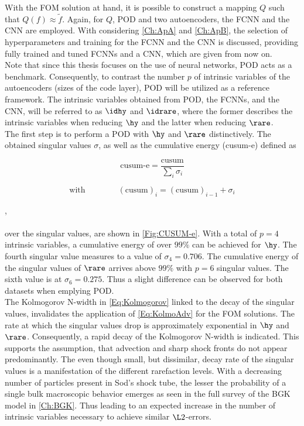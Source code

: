 With the FOM solution at hand, it is possible to construct a mapping \(Q\) such that \(Q(f)\approx \tilde{f}\). Again, for \(Q\), POD and two autoencoders, the FCNN and the CNN are employed. With considering \cref{Ch:ApA} and \cref{Ch:ApB}, the selection of hyperparameters and training for the FCNN and the CNN is discussed, providing fully trained and tuned FCNNs and a CNN, which are given from now on.\\
Note that since this thesis focuses on the use of neural networks, POD acts as a benchmark. Consequently, to contrast the number \(p\) of intrinsic variables of the autoencoders (sizes of the code layer), POD will be utilized as a reference framework. The intrinsic variables obtained from POD, the FCNNs, and the CNN, will be referred to as \(\idhy\) and \(\idrare\), where the former describes the intrinsic variables when reducing \(\hy\) and the latter when reducing \(\rare\).\\
The first step is to perform a POD with \(\hy\) and \(\rare\) distinctively. The obtained singular values \(\sigma\), as well as the cumulative energy (cusum-e) defined as\\
\noindent \begin{minipage}{.3\linewidth}
	\begin{equation}
	\textrm{cusum-e} = \frac{\textrm{cusum}}{\sum_i \sigma_i}
	\end{equation}
\end{minipage}%
\begin{minipage}{.7\linewidth}
	\begin{equation}
			\textrm{with} \qquad\qquad(\textrm{cusum})_i =(\text{cusum})_{i-1} + \sigma_{i}
	\end{equation}
\end{minipage},\\\\
over the singular values, are shown in \cref{Fig:CUSUM-e}. With a total of \(p=4\) intrinsic variables, a cumulative energy of over \(99\%\) can be achieved for \(\hy\). The fourth singular value measures to a value of \(\sigma_4 = 0.706\). The cumulative energy of the singular values of \(\rare\) arrives above \(99\%\) with \(p=6\) singular values. The sixth value is at \(\sigma_6 = 0.275\). Thus a slight difference can be observed for both datasets when emplying POD.\\
The Kolmogorov N-width in \cref{Eq:Kolmogorov} linked to the decay of the singular values, invalidates the application of \cref{Eq:KolmoAdv} for the FOM solutions. The rate at which the singular values drop is approximately exponential in \(\hy\) and \(\rare\). Consequently, a rapid decay of the Kolmogorov N-width is indicated. This supports the assumption, that advection and sharp shock fronts do not appear predominantly. The even though small, but dissimilar, decay rate of the singular values is a manifestation of the different rarefaction levels. With a decreasing number of particles present in Sod's shock tube, the lesser the probability of a single bulk macroscopic behavior emerges as seen in the full survey of the BGK model in \cref{Ch:BGK}. Thus leading to an expected increase in the number of intrinsic variables necessary to achieve similar \(\L2\)-errors.  
